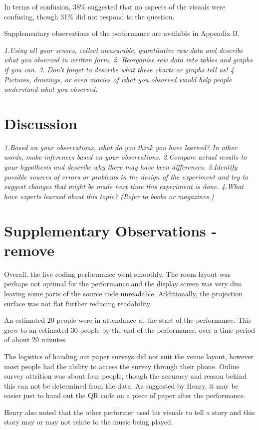 In terms of confusion, 38\% suggested that no aspects of the visuals were confusing, though 31\% did not respond to the question.

Supplementary observations of the performance are available in Appendix B.


\textit{1.Using all your senses, collect measurable, quantitative raw data and describe what you observed in written form.
2. Reorganise raw data into tables and graphs if you can.
3. Don't forget to describe what these charts or graphs tell us!
4. Pictures, drawings, or even movies of what you observed would help people understand what you observed.}

\section{Discussion}
\textit{1.Based on your observations, what do you think you have learned? In other words, make inferences based on your observations.
2.Compare actual results to your hypothesis and describe why there may have been differences.
3.Identify possible sources of errors or problems in the design of the experiment and try to suggest changes that might be made next time this experiment is done.
4.What have experts learned about this topic? (Refer to books or magazines.)}

\section{Supplementary Observations - remove}
Overall, the live coding performance went smoothly. The room layout was perhaps not optimal for the performance and the display screen was very dim leaving some parts of the source code unreadable. Additionally, the projection surface was not flat further reducing readability.

An estimated 20 people were in attendance at the start of the performance. This grew to an estimated 30 people by the end of the performance, over a time period of about 20 minutes.

The logistics of handing out paper surveys did not suit the venue layout, however most people had the ability to access the survey through their phone. Online survey attrition was about four people, though the accuracy and reason behind this can not be determined from the data. As suggested by Henry, it may be easier just to hand out the QR code on a piece of paper after the performance.

Henry also noted that the other performer used his visuals to tell a story and this story may or may not relate to the music being played.

